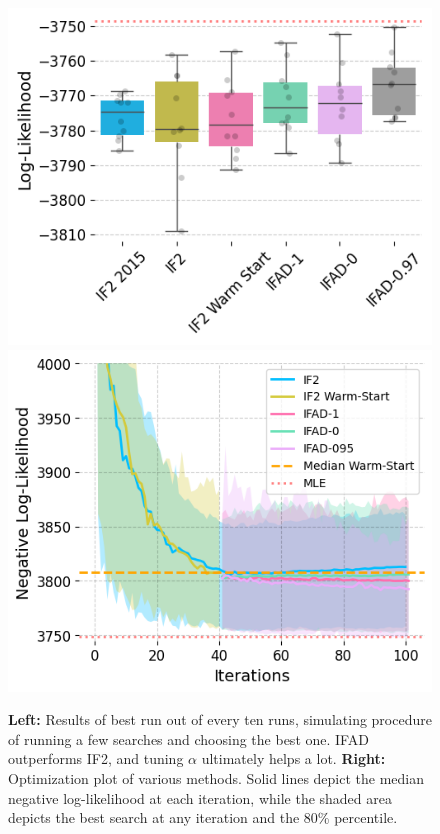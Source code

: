 \documentclass{article}
\begin{document}
\begin{figure}[htbp!]
    \centering
    \includegraphics[scale=0.5]{imgs/095/boxplot.png}
    \includegraphics[scale=0.5]{imgs/095/optim.png}
    \caption{\textbf{Left:} Results of best run out of every ten runs, simulating procedure of running a few searches and choosing the best one. IFAD outperforms IF2, and tuning $\alpha$ ultimately helps a lot. \textbf{Right:} Optimization plot of various methods. Solid lines depict the median negative log-likelihood at each iteration, while the shaded area depicts the best search at any iteration and the 80\% percentile.}
    \label{fig:boxplot-optim}
\end{figure}
\end{document}

